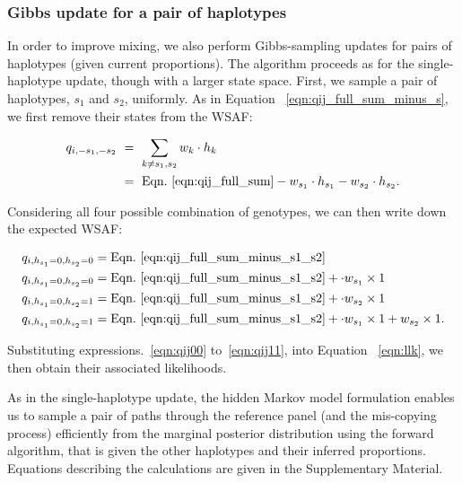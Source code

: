 \documentclass{bioinfo}
\begin{document}
\subsubsection{Gibbs update for a pair of haplotypes}\label{sec:deconvolute}

In order to improve mixing, we also perform Gibbs-sampling updates for pairs of haplotypes (given current proportions). The algorithm proceeds as for the single-haplotype update, though with a larger state space.  First, we sample a pair of haplotypes, $s_1$ and $s_2$, uniformly. As in Equation ~\eqref{eqn:qij_full_sum_minus_s}, we first remove their states from the WSAF:

\begin{equation}
\begin{split}
q_{i,-s_1, -s_2} & ~ = ~ \sum_{k\neq s_1,s_2} w_k \cdot h_k \\
                 & ~ = ~ \textrm{Eqn.~\eqref{eqn:qij_full_sum}} - w_{s_1} \cdot h_{s_1} - w_{s_2} \cdot h_{s_2}.
\label{eqn:qij_full_sum_minus_s1_s2}
\end{split}
\end{equation}

\noindent Considering all four possible combination of genotypes, we can then write down the expected WSAF:

\begin{align}
q_{i,h_{s_1}=0,h_{s_2}=0} & = \textrm{Eqn.~\eqref{eqn:qij_full_sum_minus_s1_s2}} \label{eqn:qij00}\\
q_{i,h_{s_1}=0,h_{s_2}=0} & = \textrm{Eqn.~\eqref{eqn:qij_full_sum_minus_s1_s2}} + \cdot w_{s_1} \times 1 \label{eqn:qij10}\\
q_{i,h_{s_1}=0,h_{s_2}=1} & = \textrm{Eqn.~\eqref{eqn:qij_full_sum_minus_s1_s2}} + \cdot w_{s_2} \times 1 \label{eqn:qij01}\\
q_{i,h_{s_1}=0,h_{s_2}=1} & = \textrm{Eqn.~\eqref{eqn:qij_full_sum_minus_s1_s2}} + \cdot w_{s_1} \times 1 + w_{s_2} \times 1 \label{eqn:qij11}.
\end{align}

\noindent Substituting expressions.~\eqref{eqn:qij00} to~\eqref{eqn:qij11}, into Equation ~\eqref{eqn:llk}, we then obtain their associated likelihoods.

As in the single-haplotype update, the hidden Markov model formulation enables us to sample a pair of paths through the reference panel (and the mis-copying process) efficiently from the marginal posterior distribution using the forward algorithm, that is given the other haplotypes and their inferred proportions.  Equations describing the calculations are given in the Supplementary Material.
\end{document}
